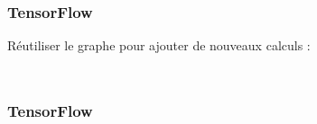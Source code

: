 \begin{frame}
  \frametitle{TensorFlow}
  Réutiliser le graphe pour ajouter de nouveaux calculs :
  \inputminted[linenos,fontsize=\small,bgcolor=pythonbg]{python}{code-illustration/tf-modify_models.py}
  \inputminted[linenos,fontsize=\small,bgcolor=returnbg]{text}{code-illustration/tf-modify_models.txt}
\end{frame}

\begin{frame}
  \frametitle{TensorFlow}
\end{frame}

